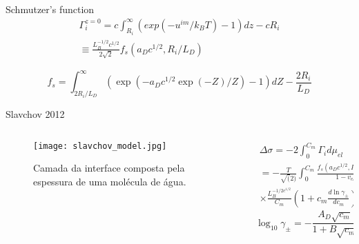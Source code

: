 \documentclass{beamer}
\begin{document}
\begin{frame}{}
         \begin{block}{Schmutzer's function}
	\begin{eqnarray}
		\Gamma_i^{z=0} = c\int_{R_i}^{\infty} (exp(-u^{im}/{k_B T})-1)dz - cR_i \\\equiv  \frac{L_B^{-1/2} c^{1/2}}{2\sqrt{2}}f_s(a_Dc^{1/2},R_i/L_D)
	\end{eqnarray}
	 \end{block}
	 \begin{equation}
               f_s = \int_{2R_i/L_D}^{\infty} (\exp(-a_D c^{1/2}\exp(-Z)/Z) -1)dZ - \frac{2R_i}{L_D}
	 \end{equation}
\end{frame}

	\begin{frame}{Slavchov 2012}
		\begin{columns}
			\begin{column}{5cm}
	\begin{figure}
         \centering
          \texttt{[image: slavchov\_model.jpg]}
	\caption{Camada da interface composta pela espessura de uma molécula de água.}
	\end{figure}
			\end{column}
			\begin{column}{5cm}
	\begin{eqnarray}
		\Delta \sigma = -2\int_{0}^{C_m} \Gamma_i d\mu_{el} \nonumber \\
		 = -\frac{T}{\sqrt(2)} \int_{0}^{C_m}\frac{f_s(a_Dc^{1/2},R_i/L_D)}{1-v_{el}c} \nonumber \\
		 \times \frac{L_B^{-1/2c^{1/2} }}{C_m}\left( 1+c_m \frac{d\ln\gamma_{\pm}}{dc_m}\right)dc_m \nonumber
	\end{eqnarray}
		\begin{equation}
                 \log_{10}\gamma_{\pm} = -\frac{A_D \sqrt{c_m}}{1+B\sqrt{c_m}} +\sum\beta_jc_m^j \nonumber
		\end{equation}
			\end{column}
		\end{columns}
\end{frame}
\end{document}
